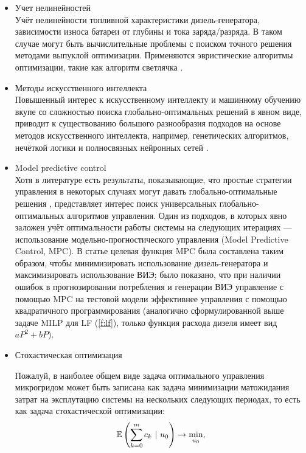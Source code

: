 \begin{itemize}
    \item Учет нелинейностей \\
    Учёт нелинейности топливной характеристики дизель-генератора,
    зависимости износа батареи от глубины и тока заряда/разряда.
    В таком случае могут быть вычислительные проблемы с поиском точного решения методами выпуклой оптимизации.
    Применяются эвристические алгоритмы оптимизации, такие как алгоритм светлячка \cite{Sufyan2019}.
    
    \item Методы искусственного интеллекта\\
    Повышенный интерес к искусственному интеллекту и машинному обучению вкупе со сложностью поиска глобально-оптимальных решений в явном виде, приводит к существованию большого разнообразия подходов на основе методов искусственного интеллекта, например, генетических алгоритмов, нечёткой логики и полносвязных нейронных сетей \cite{Olatomiwa2016, kerdphol2016rbf, chaouachi2012multiobjective, jafari2018adaptive}.
    
    \item Model predictive control \\
    Хотя в литературе есть результаты, показывающие, что простые стратегии управления в некоторых случаях могут давать глобально-оптимальные решения \cite{Barley1996}, представляет интерес поиск универсальных глобально-оптимальных алгоритмов управления.
    Один из подходов, в которых явно заложен учёт оптимальности работы системы на следующих итерациях --- использование модельно-прогностического управления (Model Predictive Control, MPC).
    В статье \cite{Tazvinga2014} целевая функция MPC была составлена таким образом, чтобы минимизировать использование дизель-генератора и максимизировать использование ВИЭ; 
    было показано, что при наличии ошибок в прогнозировании потребления и генерации ВИЭ управление с помощью MPC на тестовой модели эффективнее управления с помощью квадратичного программирования (аналогично сформулированной выше задаче MILP для LF (\ref{f:lf}), только функция расхода дизеля имеет вид $aP^2 + bP$).
    
    \item Стохастическая оптимизация
    
    Пожалуй, в наиболее общем виде задача оптимального управления микрогридом может быть записана как задача минимизации матожидания затрат на эксплутацию системы на нескольких следующих периодах, то есть как задача стохастической оптимизации:
    \begin{equation}
        \operatorname*{\mathbb{E}}\left( \sum_{k=0}^m c_k ~\vert~ u_0 \right) \rightarrow \min\limits_{u_0},
    \end{equation}
    

\end{itemize}
